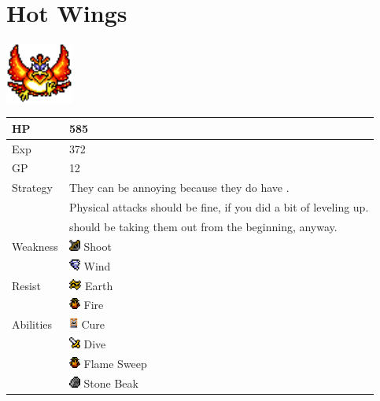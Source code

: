 \section{Hot Wings}
\label{monster:hotwings}

\includegraphics[height=2cm,keepaspectratio]{./resources/monster/hotwings}

\begin{longtable}{ l p{9cm} }
	HP
	& 585
\\ \hline
	Exp
	& 372
\\ \hline
	GP
	& 12
\\ \hline
	Strategy
	& They can be annoying because they do have \nameref{spell:cure}. \\
	& Physical attacks should be fine, if you did a bit of leveling up. \\
	& \nameref{char:reuben} should be taking them out from the beginning, anyway.
\\ \hline
	Weakness
	& \includegraphics[height=1em,keepaspectratio]{./resources/effects/shoot} Shoot \\
	& \includegraphics[height=1em,keepaspectratio]{./resources/effects/wind} Wind
\\ \hline
	Resist
	& \includegraphics[height=1em,keepaspectratio]{./resources/effects/earth} Earth \\
	& \includegraphics[height=1em,keepaspectratio]{./resources/effects/fire} Fire
\\ \hline
	Abilities
	& \includegraphics[height=1em,keepaspectratio]{./resources/spells/cure} Cure \\
	& \includegraphics[height=1em,keepaspectratio]{./resources/effects/damage} Dive \\
	& \includegraphics[height=1em,keepaspectratio]{./resources/effects/fire} Flame Sweep \\
	& \includegraphics[height=1em,keepaspectratio]{./resources/effects/petrify} Stone Beak
\end{longtable}
